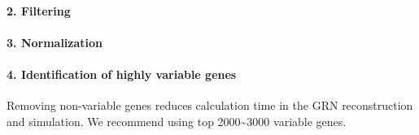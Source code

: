 \documentclass[letterpaper,10pt,english]{sphinxmanual}
\begin{document}
\paragraph{2. Filtering}
\label{\detokenize{notebooks/03_scRNA-seq_data_preprocessing/scanpy_preprocessing_with_Paul_etal_2015_data:2.-Filtering}}
{
%
\begin{sphinxVerbatim}[commandchars=\\\{\}]
\llap{\color{nbsphinxin}[4]:\,\hspace{\fboxrule}\hspace{\fboxsep}}
 

\end{sphinxVerbatim}
}


\paragraph{3. Normalization}
\label{\detokenize{notebooks/03_scRNA-seq_data_preprocessing/scanpy_preprocessing_with_Paul_etal_2015_data:3.-Normalization}}
{
%
\begin{sphinxVerbatim}[commandchars=\\\{\}]
\llap{\color{nbsphinxin}[5]:\,\hspace{\fboxrule}\hspace{\fboxsep}}
 
\end{sphinxVerbatim}
}


\paragraph{4. Identification of highly variable genes}
\label{\detokenize{notebooks/03_scRNA-seq_data_preprocessing/scanpy_preprocessing_with_Paul_etal_2015_data:4.-Identification-of-highly-variable-genes}}
Removing non-variable genes reduces calculation time in the GRN reconstruction and simulation. We recommend using top 2000\textasciitilde{}3000 variable genes.
\end{document}
